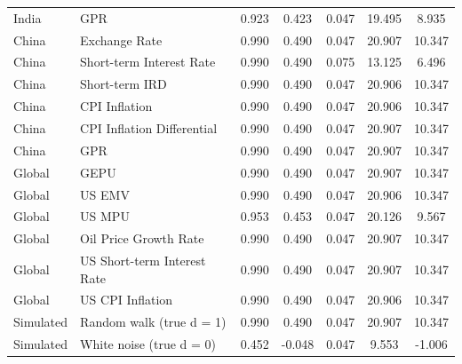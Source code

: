 \begin{table}[!htbp]
\begin{tabular}{llccccc}
India & GPR & 0.923 & 0.423 & 0.047 & 19.495 & 8.935 \\
China & Exchange Rate & 0.990 & 0.490 & 0.047 & 20.907 & 10.347 \\
China & Short-term Interest Rate & 0.990 & 0.490 & 0.075 & 13.125 & 6.496 \\
China & Short-term IRD & 0.990 & 0.490 & 0.047 & 20.906 & 10.347 \\
China & CPI Inflation & 0.990 & 0.490 & 0.047 & 20.906 & 10.347 \\
China & CPI Inflation Differential & 0.990 & 0.490 & 0.047 & 20.907 & 10.347 \\
China & GPR & 0.990 & 0.490 & 0.047 & 20.907 & 10.347 \\
Global & GEPU & 0.990 & 0.490 & 0.047 & 20.907 & 10.347 \\
Global & US EMV & 0.990 & 0.490 & 0.047 & 20.906 & 10.347 \\
Global & US MPU & 0.953 & 0.453 & 0.047 & 20.126 & 9.567 \\
Global & Oil Price Growth Rate & 0.990 & 0.490 & 0.047 & 20.907 & 10.347 \\
Global & US Short-term Interest Rate & 0.990 & 0.490 & 0.047 & 20.907 & 10.347 \\
Global & US CPI Inflation & 0.990 & 0.490 & 0.047 & 20.906 & 10.347 \\
Simulated & Random walk (true d = 1) & 0.990 & 0.490 & 0.047 & 20.907 & 10.347 \\
Simulated & White noise (true d = 0) & 0.452 & -0.048 & 0.047 & 9.553 & -1.006 \\
\hline
\end{tabular}
\label{tab:whittle_check}
\end{table}
